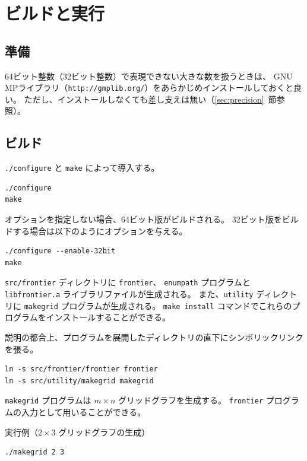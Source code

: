 \documentclass{jsarticle}
\begin{document}
\section{ビルドと実行}

\subsection{準備}

64ビット整数（32ビット整数）で表現できない大きな数を扱うときは、
GNU MPライブラリ（\texttt{http://gmplib.org/}）をあらかじめインストールしておくと良い。
ただし、インストールしなくても差し支えは無い（\ref{sec:precision}~節参照）。

\subsection{ビルド}

\texttt{./configure} と \texttt{make} によって導入する。

\begin{verbatim}
./configure
make
\end{verbatim}

オプションを指定しない場合、64ビット版がビルドされる。
32ビット版をビルドする場合は以下のようにオプションを与える。

\begin{verbatim}
./configure --enable-32bit
make
\end{verbatim}

\texttt{src/frontier} ディレクトリに \texttt{frontier}、 \texttt{enumpath} プログラムと
\texttt{libfrontier.a} ライブラリファイルが生成される。
また、\texttt{utility} ディレクトリに \texttt{makegrid} プログラムが生成される。
\texttt{make install} コマンドでこれらのプログラムをインストールすることができる。

説明の都合上、プログラムを展開したディレクトリの直下にシンボリックリンクを張る。

\begin{verbatim}
ln -s src/frontier/frontier frontier
ln -s src/utility/makegrid makegrid
\end{verbatim}

\texttt{makegrid} プログラムは $m \times n$ グリッドグラフを生成する。
\texttt{frontier} プログラムの入力として用いることができる。

実行例（$2 \times 3$ グリッドグラフの生成）

\begin{verbatim}
./makegrid 2 3
\end{verbatim}
\end{document}
